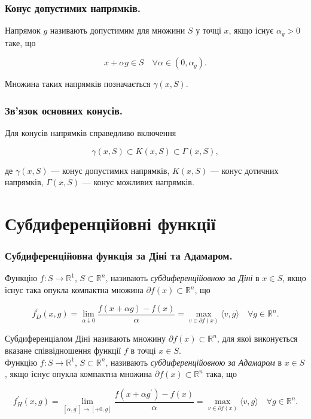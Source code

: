 \documentclass[12pt,a4paper]{extarticle}
\numberwithin{section}{part}
\begin{document}
\section{Конус допустимих напрямків.}
Напрямок $g$ називають допустимим для множини $S$ у точці $x$, якщо існує $\alpha_{g}>0$ таке, що

$$
x+\alpha g \in S \quad \forall \alpha \in\left(0, \alpha_{g}\right) .
$$

Множина таких напрямків позначається $\gamma(x, S)$.

\section{Зв'язок основних конусів.}
Для конусів напрямків справедливо включення

$$
\gamma(x, S) \subset K(x, S) \subset \Gamma(x, S),
$$

де $\gamma(x, S)$ --- конус допустимих напрямків, $K(x, S)$ --- конус дотичних напрямків, $\Gamma(x, S)$ --- конус можливих напрямків.

\part{Субдиференційовні функції}

\section{Субдиференційовна функція за Діні та Адамаром.}
Функцію $f: S \rightarrow \mathbb{R}^{1}$, $S \subset \mathbb{R}^{n}$, називають \textit{субдиференційовною за Діні} в $x \in S$, якщо існує така опукла компактна множина $\partial f(x) \subset \mathbb{R}^{n}$, що

$$
f_{D}^{\prime}(x, g)=\lim _{\alpha \downarrow 0} \frac{f(x+\alpha g)-f(x)}{\alpha}=\max _{v \in \partial f(x)}\langle v, g\rangle \quad \forall g \in \mathbb{R}^{n} .
$$

Субдиференціалом Діні називають множину $\partial f(x) \subset \mathbb{R}^{n}$, для якої виконується вказане співвідношення функції $f$ в точці $x \in S$.\\
Функцію $f: S \rightarrow \mathbb{R}^{1}$, $S \subset \mathbb{R}^{n}$, називають \textit{субдиференційовною за Адамаром} в $x \in S$, якщо існує опукла компактна множина $\partial f(x) \subset \mathbb{R}^{n}$ така, що

$$
f_{H}^{\prime}(x, g)=\lim _{\left[\alpha, g^{\prime}\right] \rightarrow[+0, g]} \frac{f\left(x+\alpha g^{\prime}\right)-f(x)}{\alpha}=\max _{v \in \partial f(x)}\langle v, g\rangle \quad \forall g \in \mathbb{R}^{n} .
$$
\end{document}
